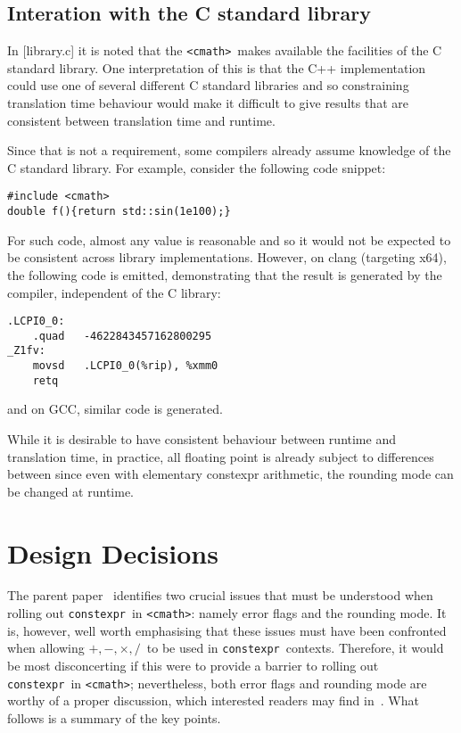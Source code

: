 \documentclass[prd,twocolumn,amsmath,amssymb,nofootinbib,eqsecnum]{revtex4-1}
\newcommand{\constexpr}{\code{constexpr}\xspace}
\newcommand{\code}[1]{{\tt #1}}
\newcommand{\header}[1]{{\tt <#1>}}
\newcommand{\cmath}{\header{cmath}}
\newcommand{\Operators}{\ensuremath{+,-,\times,/}}
\begin{document}
\subsection{Interation with the C standard library}

In [library.c] it is noted that the \cmath\ makes available the facilities of
the C standard library. One interpretation of this is that the C++
implementation could use one of several different C standard libraries and so
constraining translation time behaviour would make it difficult to give results
that are consistent between translation time and runtime.

Since that is not a requirement, some compilers already assume knowledge of
the C standard library.  For example, consider the following code
snippet:

\begin{Verbatim}
#include <cmath>
double f(){return std::sin(1e100);}
\end{Verbatim}

For such code, almost any value is reasonable and so it would not be expected to
be consistent across library implementations.  However, on clang (targeting
x64), the following code is emitted, demonstrating that the result is generated
by the compiler, independent of the C library:
\begin{Verbatim}
.LCPI0_0:
	.quad	-4622843457162800295 
_Z1fv:
	movsd	.LCPI0_0(%rip), %xmm0
	retq
\end{Verbatim}
and on GCC, similar code is generated.

While it is desirable to have consistent behaviour between runtime and
translation time, in practice, all floating point is already subject to
differences between since even with elementary constexpr arithmetic, the
rounding mode can be changed at runtime.


\section{Design Decisions}

The parent paper~\cite{Rosten-constexpr} identifies two crucial issues that must be understood when rolling out \constexpr\ in \cmath: namely error flags and the rounding mode. It is, however, well worth emphasising that these issues must have been confronted when allowing \Operators\ to be used in \constexpr\ contexts. Therefore, it would be most disconcerting if this were to provide a barrier to rolling out \constexpr\ in \cmath; nevertheless, both error flags and rounding mode are worthy of a proper discussion, which interested readers may find in~\cite{Rosten-constexpr}. What follows is a summary of the key points.
\end{document}
